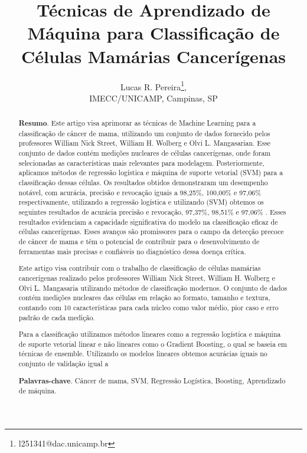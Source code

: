 \documentclass{pssbmac}
\begin{document}

\title{Técnicas de Aprendizado de Máquina para Classificação de Células Mamárias Cancerígenas}


\author{
    {\large Lucas R. Pereira}\thanks{l251341@dac.unicamp.br},  \\
    {\small IMECC/UNICAMP, Campinas, SP} \\
}
\criartitulo



\begin{abstract}
{\bf Resumo}.
Este artigo visa aprimorar as técnicas de Machine Learning para a classificação de câncer de mama, utilizando um conjunto de dados fornecido pelos professores William Nick Street, William H. Wolberg e Olvi L. Mangasarian. Esse conjunto de dados contém medições nucleares de células cancerígenas, onde foram selecionadas as características mais relevantes para modelagem. Posteriormente, aplicamos métodos de regressão logística e máquina de suporte vetorial (SVM) para a classificação dessas células. Os resultados obtidos demonstraram um desempenho notável, com acurácia, precisão e revocação iguais a 98,25\%, 100,00\% e 97,06\% respectivamente, utilizando a regressão logística e utilizando (SVM) obtemos os seguintes resultados de acurácia precisão e revocação, 97,37\%, 98,51\% e 97,06\% . Esses resultados evidenciam a capacidade significativa do modelo na classificação eficaz de células cancerígenas. Esses avanços são promissores para o campo da detecção precoce de câncer de mama e têm o potencial de contribuir para o desenvolvimento de ferramentas mais precisas e confiáveis no diagnóstico dessa doença crítica.

Este artigo visa contribuir com o trabalho de classificação de células mamárias cancerígenas realizado pelos professores William Nick Street, William H. Wolberg e Olvi L. Mangasaria utilizando métodos de classificação modernos. O conjunto de dados contém medições nucleares das células em relação ao formato, tamanho e textura, contando com 10 características para cada núcleo como valor médio, pior caso e erro padrão de cada medição.

Para a classificação utilizamos métodos lineares como a regressão logística e máquina de suporte vetorial linear e não lineares como o Gradient Boosting, o qual se baseia em técnicas de ensemble. Utilizando os modelos lineares obtemos acurácias iguais no conjunto de validação igual a 


\noindent
{\bf Palavras-chave}. Câncer de mama, SVM, Regressão Logística, Boosting, Aprendizado de máquina.
\end{abstract}
\end{document}

